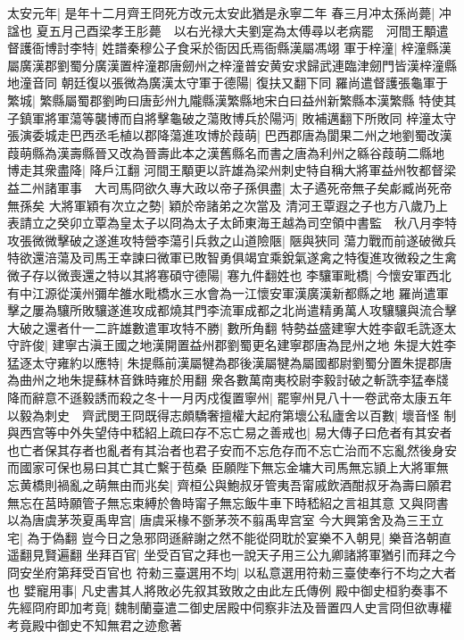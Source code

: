 太安元年|{
	是年十二月齊王冏死方改元太安此猶是永寧二年}
春三月冲太孫尚薨|{
	冲諡也}
夏五月己酉梁孝王肜薨　以右光禄大夫劉寔為太傅尋以老病罷　河間王顒遣督護衙博討李特|{
	姓譜秦穆公子食采於衙因氏焉衙縣漢屬馮翊}
軍于梓潼|{
	梓潼縣漢屬廣漢郡劉蜀分廣漢置梓潼郡唐劒州之梓潼普安黄安求歸武連臨津劒門皆漢梓潼縣地潼音同}
朝廷復以張微為廣漢太守軍于德陽|{
	復扶又翻下同}
羅尚遣督護張龜軍于繁城|{
	繁縣屬蜀郡劉昫曰唐彭州九隴縣漢繁縣地宋白曰益州新繁縣本漢繁縣}
特使其子鎮軍將軍蕩等襲博而自將擊龜破之蕩敗博兵於陽沔|{
	敗補邁翻下所敗同}
梓潼太守張演委城走巴西丞毛植以郡降蕩進攻博於葭萌|{
	巴西郡唐為閬果二州之地劉蜀改漢葭萌縣為漢壽縣晉又改為晉壽此本之漢舊縣名而書之唐為利州之緜谷葭萌二縣地}
博走其衆盡降|{
	降戶江翻}
河間王顒更以許雄為梁州刺史特自稱大將軍益州牧都督梁益二州諸軍事　大司馬冏欲久專大政以帝子孫俱盡|{
	太子遹死帝無子矣虨臧尚死帝無孫矣}
大將軍穎有次立之勢|{
	穎於帝諸弟之次當及}
清河王覃遐之子也方八歲乃上表請立之癸卯立覃為皇太子以冏為太子太師東海王越為司空領中書監　秋八月李特攻張微微擊破之遂進攻特營李蕩引兵救之山道險陿|{
	陿與狹同}
蕩力戰而前遂破微兵特欲還涪蕩及司馬王幸諫曰微軍已敗智勇俱竭宜乘銳氣遂禽之特復進攻微殺之生禽微子存以微喪還之特以其將寋碩守德陽|{
	寋九件翻姓也}
李驤軍毗橋|{
	今懷安軍西北有中江源從漢州彌牟雒水毗橋水三水會為一江懷安軍漢廣漢新都縣之地}
羅尚遣軍擊之屢為驤所敗驤遂進攻成都燒其門李流軍成都之北尚遣精勇萬人攻驤驤與流合擊大破之還者什一二許雄數遣軍攻特不勝|{
	數所角翻}
特勢益盛建寧大姓李叡毛詵逐太守許俊|{
	建寧古滇王國之地漢開置益州郡劉蜀更名建寧郡唐為昆州之地}
朱提大姓李猛逐太守雍約以應特|{
	朱提縣前漢屬犍為郡後漢屬犍為屬國都尉劉蜀分置朱提郡唐為曲州之地朱提蘇林音銖時雍於用翻}
衆各數萬南夷校尉李毅討破之斬詵李猛奉牋降而辭意不遜毅誘而殺之冬十一月丙戍復置寧州|{
	罷寧州見八十一卷武帝太康五年}
以毅為刺史　齊武閔王冏既得志頗驕奢擅權大起府第壞公私廬舍以百數|{
	壞音怪}
制與西宫等中外失望侍中嵇紹上疏曰存不忘亡易之善戒也|{
	易大傳子曰危者有其安者也亡者保其存者也亂者有其治者也君子安而不忘危存而不忘亡治而不忘亂然後身安而國家可保也易曰其亡其亡繫于苞桑}
臣願陛下無忘金墉大司馬無忘頴上大將軍無忘黄橋則禍亂之萌無由而兆矣|{
	齊桓公與鮑叔牙管夷吾甯戚飲酒酣叔牙為壽曰願君無忘在莒時願管子無忘束縛於魯時甯子無忘飯牛車下時嵇紹之言祖其意}
又與冏書以為唐虞茅茨夏禹卑宫|{
	唐虞采椽不斵茅茨不翦禹卑宫室}
今大興第舍及為三王立宅|{
	為于偽翻}
豈今日之急邪冏遜辭謝之然不能從冏耽於宴樂不入朝見|{
	樂音洛朝直遥翻見賢遍翻}
坐拜百官|{
	坐受百官之拜也一說天子用三公九卿諸將軍猶引而拜之今冏安坐府第拜受百官也}
符勑三臺選用不均|{
	以私意選用符勑三臺使奉行不均之大者也}
嬖寵用事|{
	凡史書其人將敗必先叙其致敗之由此左氏傳例}
殿中御史桓豹奏事不先經冏府即加考竟|{
	魏制蘭臺遣二御史居殿中伺察非法及晉置四人史言冏但欲專權考竟殿中御史不知無君之迹愈著}
